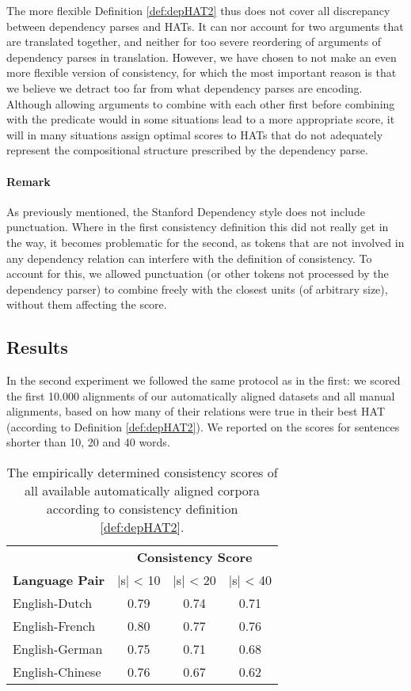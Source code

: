 The more flexible Definition \ref{def:depHAT2} thus does not cover all discrepancy between dependency parses and HATs. It can nor account for two arguments that are translated together, and neither for too severe reordering of arguments of dependency parses in translation. However, we have chosen to not make an even more flexible version of consistency, for which the most important reason is that we believe we detract too far from what dependency parses are encoding. Although allowing arguments to combine with each other first before combining with the predicate would in some situations lead to a more appropriate score, it will in many situations assign optimal scores to HATs that do not adequately represent the compositional structure prescribed by the dependency parse.%

\paragraph{Remark} As previously mentioned, the Stanford Dependency style does not include punctuation. Where in the first consistency definition this did not really get in the way, it becomes problematic for the second, as tokens that are not involved in any dependency relation can interfere with the definition of consistency. To account for this, we allowed punctuation (or other tokens not processed by the dependency parser) to combine freely with the closest units (of arbitrary size), without them affecting the score.

\subsection{Results}

In the second experiment we followed the same protocol as in the first: we scored the first 10.000 alignments of our automatically aligned datasets and all manual alignments, based on how many of their relations were true in their best HAT (according to Definition \ref{def:depHAT2}). We reported on the scores for sentences shorter than 10, 20 and 40 words.

\begin{table}[!ht]
\centering
\begin{tabular}{|l|c|c|c|}
\hline
&\multicolumn{3}{c|}{\textbf{Consistency Score}}\\
\textbf{Language Pair} & |s| < 10 & |s| < 20 & |s| < 40\\
\hline \hline
English-Dutch & 0.79 & 0.74 & 0.71 \\
\hline
English-French & 0.80 & 0.77 & 0.76\\
\hline
English-German & 0.75 & 0.71 & 0.68 \\
\hline
English-Chinese & 0.76 & 0.67 & 0.62\\
\hline
\end{tabular}
\caption{The empirically determined consistency scores of all available automatically aligned corpora according to consistency definition \ref{def:depHAT2}.}\label{tab:scores3}
\end{table}

